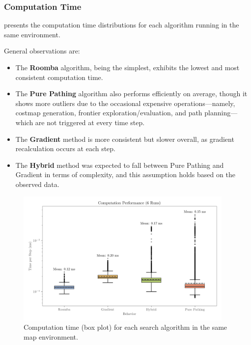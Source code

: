 \subsubsection{Computation Time}
 presents the computation time distributions for each algorithm running in the same environment.

General observations are:

\begin{itemize}
  \item The \textbf{Roomba} algorithm, being the simplest, exhibits the lowest and most consistent computation time.
  \item The \textbf{Pure Pathing} algorithm also performs efficiently on average, though it shows more outliers due to the occasional expensive operations—namely, costmap generation, frontier exploration/evaluation, and path planning—which are not triggered at every time step.
  \item The \textbf{Gradient} method is more consistent but slower overall, as gradient recalculation occurs at each step.
  \item The \textbf{Hybrid} method was expected to fall between Pure Pathing and Gradient in terms of complexity, and this assumption holds based on the observed data.
\end{itemize}

\begin{figure}[H]
    \begin{center}
        \includegraphics[width=0.95\textwidth]{./figures/plots/computation-performance-(6-runs).png}
    \end{center}
    \caption{Computation time (box plot) for each search algorithm in the same map environment.}
    \label{fig:computation-performance}
\end{figure}

